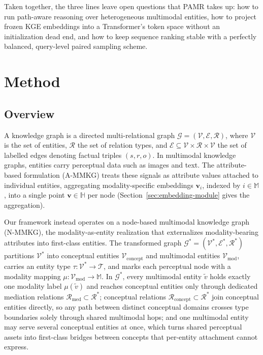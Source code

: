\documentclass[runningheads]{llncs}
\begin{document}

Taken together, the three lines leave open questions that PAMR takes up: how to run path-aware reasoning over heterogeneous multimodal entities, how to project frozen KGE embeddings into a Transformer's token space without an initialization dead end, and how to keep sequence ranking stable with a perfectly balanced, query-level paired sampling scheme.

\section{Method}
\label{sec:method}
\subsection{Overview}
\label{sec:overview}

A knowledge graph is a directed multi-relational graph
$\mathcal{G} = (\mathcal{V}, \mathcal{E}, \mathcal{R})$, where $\mathcal{V}$
is the set of entities, $\mathcal{R}$ the set of relation types, and
$\mathcal{E} \subseteq \mathcal{V} \times \mathcal{R} \times \mathcal{V}$ the
set of labelled edges denoting factual triples $(s, r, o)$. In multimodal
knowledge graphs, entities carry perceptual data such as images and text.
The attribute-based formulation (A-MMKG) treats these signals as attribute
values attached to individual entities, aggregating modality-specific
embeddings $\mathbf{v}_i$, indexed by $i \in \mathbb{M}$, into a single
point $\mathbf{v} \in \mathbb{H}$ per node
(Section~\ref{sec:embedding-module} gives the aggregation).

Our framework instead operates on a node-based multimodal knowledge graph
(N-MMKG), the modality-as-entity realization that externalizes
modality-bearing attributes into first-class entities. The transformed
graph $\mathcal{G}^* = (\mathcal{V}^*, \mathcal{E}^*, \mathcal{R}^*)$
partitions $\mathcal{V}^*$ into conceptual entities
$\mathcal{V}_{\text{concept}}$ and multimodal entities
$\mathcal{V}_{\text{mod}}$, carries an entity type
$\tau: \mathcal{V}^* \to \mathcal{T}$, and marks each perceptual node with
a modality mapping $\mu: \mathcal{V}_{\text{mod}} \to \mathbb{M}$. In
$\mathcal{G}^*$, every multimodal entity $\tilde{v}$ holds exactly one
modality label $\mu(\tilde{v})$ and reaches conceptual entities only
through dedicated mediation relations $\mathcal{R}_{\text{med}} \subset
\mathcal{R}^*$; conceptual relations $\mathcal{R}_{\text{concept}} \subset
\mathcal{R}^*$ join conceptual entities directly, so any path between
distinct conceptual domains crosses type boundaries solely through shared
multimodal hops; and one multimodal entity may serve several conceptual
entities at once, which turns shared perceptual assets into first-class
bridges between concepts that per-entity attachment cannot express.
\end{document}
